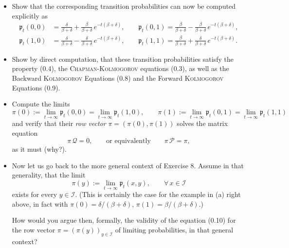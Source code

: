 \documentclass[letterpaper]{article}
\begin{document}
		\begin{itemize}
			\item[(a)] Show that the corresponding transition probabilities can now be computed explicitly as
			\begin{align*}
				\mathfrak{p}_t(0,0) &= \frac{\delta}{\beta+\delta} + \frac{\beta}{\beta+\delta}\, e^{-t(\beta+\delta)}, \qquad \mathfrak{p}_t(0,1) = \frac{\beta}{\beta+\delta} - \frac{\beta}{\beta+\delta}\, e^{-t(\beta+\delta)}, \\[6pt]
				\mathfrak{p}_t(1,0) &= \frac{\delta}{\beta+\delta} - \frac{\delta}{\beta+\delta}\, e^{-t(\beta+\delta)}, \qquad \mathfrak{p}_t(1,1) = \frac{\beta}{\beta+\delta} + \frac{\delta}{\beta+\delta}\, e^{-t(\beta+\delta)}.
			\end{align*}
			
			\item[(b)] Show by direct computation, that these transition probabilities satisfy the property (0.4), the \textsc{Chapman-Kolmogorov} equations (0.3), as well as the Backward \textsc{Kolmogorov} Equations (0.8) and the Forward \textsc{Kolmogorov} Equations (0.9).
			
			\item[(c)] Compute the limits
			\[
			\pi(0) := \lim_{t \to \infty} \mathfrak{p}_t(0,0) = \lim_{t \to \infty} \mathfrak{p}_t(1,0), \qquad \pi(1) := \lim_{t \to \infty} \mathfrak{p}_t(0,1) = \lim_{t \to \infty} \mathfrak{p}_t(1,1)
			\]
			and verify that their \textit{row vector} $\pi = (\pi(0), \pi(1))$ solves the matrix equation
			\begin{equation}
				\pi\, \mathcal{Q} = 0, \qquad \text{or equivalently} \qquad \pi\, \mathcal{P} = \pi, \tag{0.10}
			\end{equation}
			as it must (why?).
			
			\item[(d)] Now let us go back to the more general context of Exercise 8. Assume in that generality, that the limit
			\[
			\pi(y) := \lim_{t \to \infty} \mathfrak{p}_t(x, y), \qquad \forall\, x \in \mathcal{I}
			\]
			exists for every $y \in \mathcal{I}$. (This is certainly the case for the example in (a) right above, in fact with $\pi(0) = \delta/(\beta+\delta)$, $\pi(1) = \beta/(\beta+\delta)$.)
			
			How would you argue then, formally, the validity of the equation (0.10) for the row vector $\pi = (\pi(y))_{y \in \mathcal{I}}$ of limiting probabilities, in that general context?
		\end{itemize}
		
\end{document}
